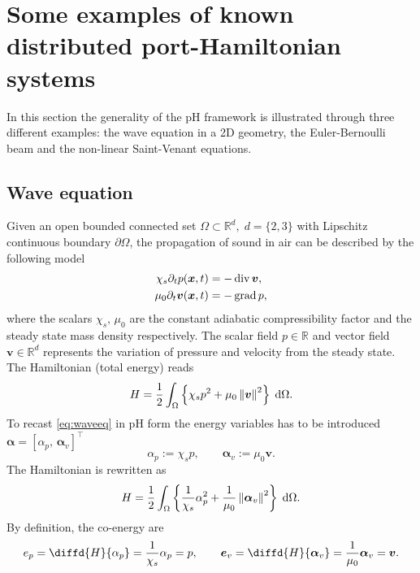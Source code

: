\section{Some examples of known distributed port-Hamiltonian systems}

In this section the generality of the pH framework is illustrated through three different examples: the wave equation in a 2D geometry, the Euler-Bernoulli beam and the non-linear Saint-Venant equations. 

\subsection{Wave equation}\label{sec:waveeq}

Given an open bounded connected set $\Omega \subset \mathbb{R}^d, \; d=\{2,3\}$ with Lipschitz continuous boundary $\partial\Omega$, the propagation of sound in air can be described by the following model \cite{trenchant2018}
\begin{equation}\label{eq:waveeq}
\begin{aligned}
\chi_s \partial_{t} p(\bm{x}, t) &=-\operatorname{div} \bm{v}, \\
\mu_0 \partial_{t} \bm{v}(\bm{x}, t) &= -\operatorname*{grad} p, \\
\end{aligned}
\end{equation}
where the scalars $\chi_s, \, \mu_0$ are the constant adiabatic compressibility factor and the steady state mass density respectively. The scalar field $p \in \mathbb{R}$ and vector field $\bm{v} \in \mathbb{R}^d$ represents the variation of pressure and velocity from the steady state. The Hamiltonian (total energy) reads
\begin{equation*}
H = \frac{1}{2} \int_{\Omega} \left\{\chi_s p^2 + {\mu_0}\norm{\bm{v}}^2 \right\} \d\Omega.
\end{equation*}
To recast \eqref{eq:waveeq} in pH form the energy variables has to be introduced $\bm{\alpha} = [\alpha_p, \, \bm{\alpha}_v]^\top$
\begin{equation*}
\alpha_p := \chi_s p, \qquad \bm{\alpha}_v := \mu_0 \bm{v}.
\end{equation*} 
The Hamiltonian is rewritten as
\begin{equation*}
H = \frac{1}{2} \int_{\Omega} \left\{\frac{1}{\chi_s}\alpha_p^2 + \frac{1}{\mu_0} \norm{\bm{\alpha}_v}^2 \right\} \d\Omega.
\end{equation*}
By definition, the co-energy are 
\begin{equation*}
e_p = \diffd{H}{\alpha_p} = \frac{1}{\chi_s}\alpha_p = p, \qquad \bm{e}_v = \diffd{H}{\bm{\alpha}_v} = \frac{1}{\mu_0} \bm{\alpha}_v = \bm{v}.
\end{equation*}
